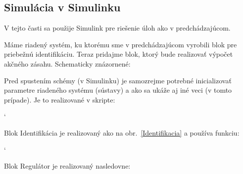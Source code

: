 \documentclass[a4paper, 10pt, ]{article}
\begin{document}
\subsection{Simulácia v Simulinku}



V tejto časti sa použije Simulink pre riešenie úloh ako v predchádzajúcom.

\medskip

\noindent
Máme riadený systém, ku ktorému sme v predchádzajúcom vyrobili blok pre priebežnú identifikáciu. Teraz pridajme blok, ktorý bude realizovať výpočet akčného zásahu. Schematicky znázornené:

\begin{centering}


    \vspace{-2mm}

    \figcaption{}

    \vspace{2mm}

    \label{ar03_sim_RST}

\end{centering}

Pred spustením schémy (v Simulinku) je samozrejme potrebné inicializovať parametre riadeného systému (sústavy) a ako sa ukáže aj iné veci (v tomto prípade). Je to realizované v skripte:
{\catcode`

}



\noindent
Blok Identifikácia je realizovaný ako na obr.~\ref{Identifikacia} a používa funkciu:
{\catcode`

}



\noindent
Blok Regulátor je realizovaný nasledovne:

\begin{centering}


    \vspace{-2mm}

    \figcaption{}

    \vspace{2mm}

    \label{Regulator}

\end{centering}
\end{document}

